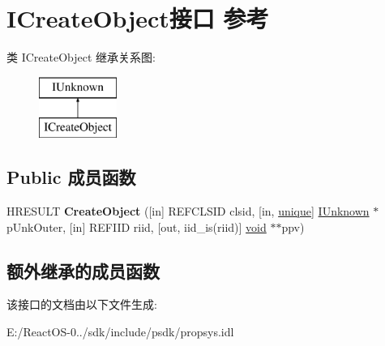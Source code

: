 \hypertarget{interface_i_create_object}{}\section{I\+Create\+Object接口 参考}
\label{interface_i_create_object}
类 I\+Create\+Object 继承关系图\+:\begin{figure}[H]
\begin{center}
\leavevmode
\includegraphics[height=2.000000cm]{interface_i_create_object}
\end{center}
\end{figure}
\subsection*{Public 成员函数}
\begin{DoxyCompactItemize}
\item 
\mbox{\label{interface_i_create_object_aaba14488eab54d623bd99c547a3bdb06}} 
H\+R\+E\+S\+U\+LT {\bfseries Create\+Object} (\mbox{[}in\mbox{]} R\+E\+F\+C\+L\+S\+ID clsid, \mbox{[}in, \hyperlink{interfaceunique}{unique}\mbox{]} \hyperlink{interface_i_unknown}{I\+Unknown} $\ast$p\+Unk\+Outer, \mbox{[}in\mbox{]} R\+E\+F\+I\+ID riid, \mbox{[}out, iid\+\_\+is(riid)\mbox{]} \hyperlink{interfacevoid}{void} $\ast$$\ast$ppv)
\end{DoxyCompactItemize}
\subsection*{额外继承的成员函数}


该接口的文档由以下文件生成\+:\begin{DoxyCompactItemize}
\item 
E\+:/\+React\+O\+S-\/0../sdk/include/psdk/propsys.\+idl\end{DoxyCompactItemize}
